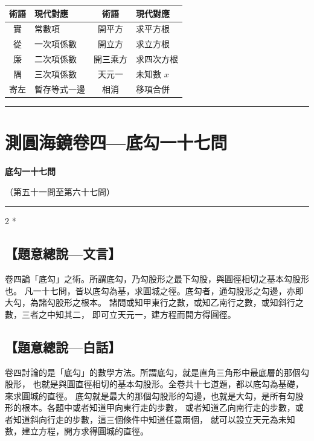 \documentclass[11pt,a4paper]{article}
\newcommand{\longline}{\noindent\rule{\textwidth}{0.4pt}}
\begin{document}
\vspace{0.3cm}
\begin{center}
\begin{tabular}{|c|l|c|l|}
\hline
\textbf{術語} & \textbf{現代對應} & \textbf{術語} & \textbf{現代對應} \\
\hline
實 & 常數項 & 開平方 & 求平方根 \\
從 & 一次項係數 & 開立方 & 求立方根 \\
廉 & 二次項係數 & 開三乘方 & 求四次方根 \\
隅 & 三次項係數 & 天元一 & 未知數 $x$ \\
寄左 & 暫存等式一邊 & 相消 & 移項合併 \\
\hline
\end{tabular}
\end{center}

\vspace{0.5cm}
\longline
\newpage
\section{測圓海鏡卷四---底勾一十七問}
\label{sec:vol4}

\begin{center}
{\Large\bfseries\color{volcolor} 底勾一十七問}

\vspace{0.2cm}
{\small\color{notecolor} （第五十一問至第六十七問）}
\end{center}

\vspace{0.3cm}
\longline
\vspace{0.3cm}

\begin{paracol}{2}
\switchcolumn[0]*\subsection*{【題意總說---文言】}
{\small 卷四論「底勾」之術。所謂底勾，乃勾股形之最下勾股，與圓徑相切之基本勾股形也。
凡一十七問，皆以底勾為基，求圓城之徑。底勾者，通勾股形之勾邊，亦即大勾，為諸勾股形之根本。
諸問或知甲東行之數，或知乙南行之數，或知斜行之數，三者之中知其二，
即可立天元一，建方程而開方得圓徑。}

\switchcolumn\subsection*{【題意總說---白話】}
{\small 卷四討論的是「底勾」的數學方法。所謂底勾，就是直角三角形中最底層的那個勾股形，
也就是與圓直徑相切的基本勾股形。全卷共十七道題，都以底勾為基礎，來求圓城的直徑。
底勾就是最大的那個勾股形的勾邊，也就是大勾，是所有勾股形的根本。各題中或者知道甲向東行走的步數，
或者知道乙向南行走的步數，或者知道斜向行走的步數，這三個條件中知道任意兩個，
就可以設立天元為未知數，建立方程，開方求得圓城的直徑。}
\end{paracol}
\end{document}
